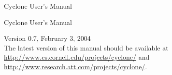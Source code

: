 \newif\ifpdf
\ifx\pdfoutput\undefined
  \pdffalse               %
\else
  \pdftrue
\fi

\usepackage{alltt}

\usepackage{makeidx}
\makeindex
\usepackage{color}
\usepackage{palatino}
\usepackage[colorlinks=true,linkcolor=bluegray,anchorcolor=bluegray,
citecolor=bluegray,filecolor=bluegray,menucolor=bluegray,pagecolor=bluegray,
urlcolor=bluegray]{hyperref}

\ifscreen
\setlength\paperheight{6in}
\setlength\paperwidth{8in}
\setlength\oddsidemargin{-.5in}
\setlength\textwidth{7in}
\setlength\topmargin{-1in}
\setlength\textheight{5in}
\ifpdf
\pdfpageheight=6in
\pdfpagewidth=8in
\fi %
\fi %

\usepackage{underscore}

\newcommand{\bs}{\texttt{\char`\\}}
\newcommand{\lb}{\texttt{\char`\{}}
\newcommand{\rb}{\texttt{\char`\}}}





\ifscreen
\thispagestyle{empty}
\textcolor{bluegray}{
\vspace{.5in}
\begin{center}
  {\fontsize{.9in}{.8in}\selectfont Cyclone User's Manual}\\[.5in]
\end{center}
}
\else
\vspace{1in}
\begin{center}
  \Huge Cyclone User's Manual
\end{center}
\fi
\begin{center}
{\Large Version 0.7, February 3, 2004}\\[3ex]
The latest version of this manual should be available at\\
\href{http://www.cs.cornell.edu/projects/cyclone/}{http://www.cs.cornell.edu/projects/cyclone/} and\\
\href{http://www.research.att.com/projects/cyclone/}{http://www.research.att.com/projects/cyclone/}.
\end{center}


